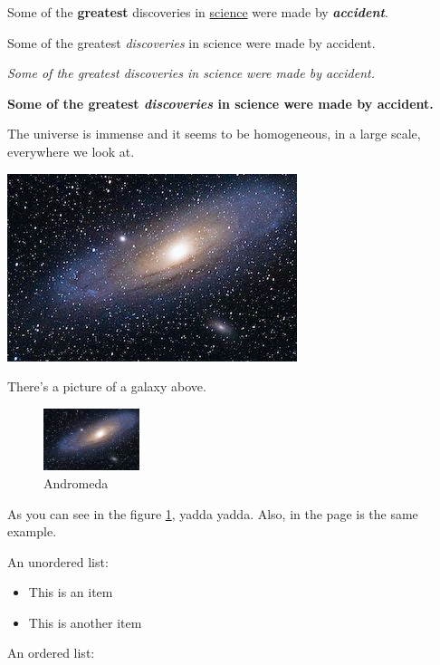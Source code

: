 \documentclass[11pt, letterpaper]{article}
\begin{document}
Some of the \textbf{greatest} discoveries in \underline{science} were made by \textbf{\textit{accident}}.

Some of the greatest \emph{discoveries} in science were made by accident.

\textit{Some of the greatest \emph{discoveries} in science were made by accident.}

\textbf{Some of the greatest \emph{discoveries} in science were made by accident.}

The universe is immense and it seems to be homogeneous, 
in a large scale, everywhere we look at.

\includegraphics{galaxy}

There's a picture of a galaxy above.

\clearpage

\begin{figure}[h]
    \centering
    \includegraphics[width=0.25\textwidth]{galaxy}
    \caption{Andromeda}
    \label{fig:andromeda}
\end{figure}

As you can see in the figure \ref{fig:andromeda}, yadda yadda. Also, in the page \pageref{fig:andromeda} is the same example.


An unordered list:

\begin{itemize}
    \item This is an item
    \item This is another item
\end{itemize}

An ordered list:
\end{document}
